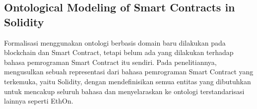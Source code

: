\subsection{Ontological Modeling of Smart Contracts in Solidity}
\label{subsec:solidity-ontology}

Formalisasi menggunakan ontologi berbasis domain baru dilakukan pada blockchain dan Smart Contract, tetapi belum ada yang dilakukan terhadap bahasa pemrograman Smart Contract itu sendiri. Pada penelitiannya, \cite{cano2021toward} mengusulkan sebuah representasi dari bahasa pemrograman Smart Contract yang terkemuka, yaitu Solidity, dengan mendefinisikan semua entitas yang dibutuhkan untuk mencakup seluruh bahasa dan menyelaraskan ke ontologi terstandarisasi lainnya seperti EthOn.



